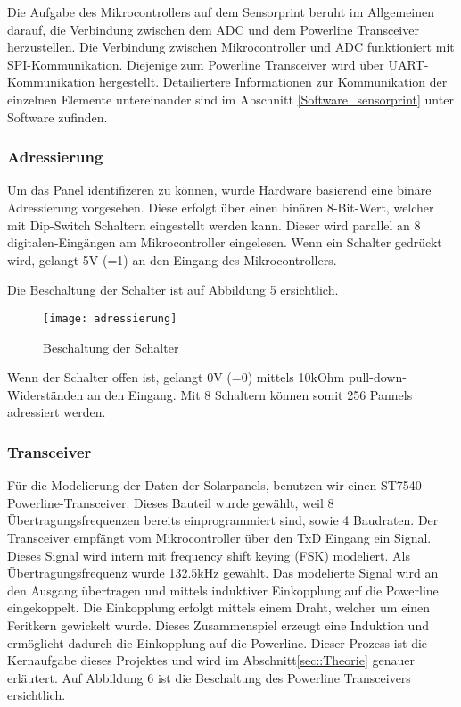 Die Aufgabe des Mikrocontrollers auf dem Sensorprint beruht im Allgemeinen darauf, die Verbindung zwischen dem ADC und dem Powerline Transceiver herzustellen. Die Verbindung zwischen Mikrocontroller und ADC funktioniert mit SPI-Kommunikation. Diejenige zum Powerline Transceiver wird über UART-Kommunikation hergestellt. Detailiertere Informationen zur Kommunikation der einzelnen Elemente untereinander sind im Abschnitt \ref{Software_sensorprint} unter Software zufinden.


\clearpage

\subsubsection{Adressierung}
Um das Panel identifizeren zu können, wurde Hardware basierend eine binäre Adressierung vorgesehen. Diese erfolgt über einen binären 8-Bit-Wert, welcher mit Dip-Switch Schaltern eingestellt werden kann. Dieser wird parallel an 8 digitalen-Eingängen am Mikrocontroller eingelesen. Wenn ein Schalter gedrückt wird, gelangt 5V (=1) an den Eingang des Mikrocontrollers.

Die Beschaltung der Schalter ist auf Abbildung 5 ersichtlich.

\begin{figure}[h]
\centering
\texttt{[image: adressierung]}
\caption{Beschaltung der Schalter}
\end{figure}

 Wenn der Schalter offen ist, gelangt 0V (=0) mittels 10kOhm pull-down-Widerständen an den Eingang. Mit 8 Schaltern können somit 256 Pannels adressiert werden.
 
\clearpage

\subsubsection{Transceiver}
Für die Modelierung der Daten der Solarpanels, benutzen wir einen ST7540-Powerline-Transceiver. Dieses Bauteil wurde gewählt, weil 8 Übertragungsfrequenzen bereits einprogrammiert sind, sowie 4 Baudraten. Der Transceiver empfängt vom Mikrocontroller über den TxD Eingang ein Signal. Dieses Signal wird intern mit frequency shift keying (FSK) modeliert. Als Übertragungsfrequenz wurde 132.5kHz gewählt. Das modelierte Signal wird an den Ausgang übertragen und mittels induktiver Einkopplung auf die Powerline eingekoppelt. Die Einkopplung erfolgt mittels einem Draht, welcher um einen Feritkern gewickelt wurde. Dieses Zusammenspiel erzeugt eine Induktion und ermöglicht dadurch die Einkopplung auf die Powerline. Dieser Prozess ist die Kernaufgabe dieses Projektes und wird im Abschnitt\ref{sec::Theorie} genauer erläutert. Auf Abbildung 6 ist die Beschaltung des Powerline Transceivers ersichtlich.

